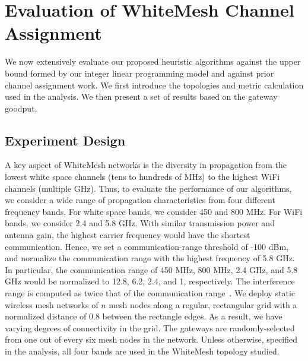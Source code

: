\section{Evaluation of WhiteMesh Channel Assignment}
\label{sec:experimentdesign}

We now extensively evaluate our proposed heuristic algorithms against the upper 
bound formed by our integer linear programming model and against prior channel 
assignment work. We first introduce the topologies and metric calculation used 
in the analysis.  We then present a set of results based on the gateway goodput.




\subsection{Experiment Design}
\label{subsec:design}
A key aspect of WhiteMesh networks is the diversity in propagation from the lowest white
space channels (tens to hundreds of MHz) to the highest WiFi channels (multiple GHz). Thus, 
to evaluate the performance of our algorithms, we consider a wide range of propagation 
characteristics from four different frequency bands.  For white space bands, we consider
450 and 800 MHz.  For WiFi bands, we consider 2.4 and 5.8 GHz.  With similar transmission
power and antenna gain, the highest carrier frequency would have the shortest communication.
Hence, we set a communication-range threshold of -100 dBm, and normalize the communication 
range with the highest frequency of 5.8 GHz. In particular, the communication range of 
450 MHz, 800 MHz, 2.4 GHz, and 5.8 GHz would be normalized to 12.8, 6.2, 2.4, and 1, respectively.  
The interference range is computed as twice that of the communication 
range~\cite{raniwala2005architecture}. We deploy static wireless mesh networks of $n$ 
mesh nodes along a regular, rectangular grid with a normalized distance of 0.8 between the 
rectangle edges.  As a result, we have varying degrees of connectivity in the grid.
The gateways are randomly-selected from one out of every six mesh nodes in the network.
Unless otherwise, specified in the analysis, all four bands are used in the WhiteMesh
topology studied. 


